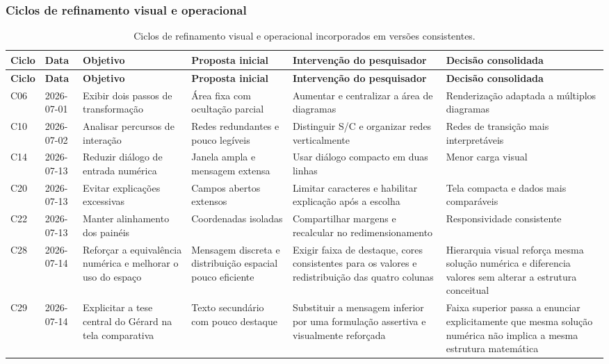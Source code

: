 \subsubsection{Ciclos de refinamento visual e operacional}
\begin{landscape}
\begingroup
\setlength{\tabcolsep}{3pt}
\small
\begin{longtable}{p{1.0cm}p{1.9cm}p{4.0cm}p{5.0cm}p{6.2cm}p{5.7cm}}
\caption{Ciclos de refinamento visual e operacional incorporados em versões consistentes.}\\
\toprule
\textbf{Ciclo} & \textbf{Data} & \textbf{Objetivo} & \textbf{Proposta inicial} & \textbf{Intervenção do pesquisador} & \textbf{Decisão consolidada} \\
\midrule
\endfirsthead
\toprule
\textbf{Ciclo} & \textbf{Data} & \textbf{Objetivo} & \textbf{Proposta inicial} & \textbf{Intervenção do pesquisador} & \textbf{Decisão consolidada} \\
\midrule
\endhead
C06 & 2026-07-01 & Exibir dois passos de transformação & Área fixa com ocultação parcial & Aumentar e centralizar a área de diagramas & Renderização adaptada a múltiplos diagramas \\
\addlinespace[2pt]
C10 & 2026-07-02 & Analisar percursos de interação & Redes redundantes e pouco legíveis & Distinguir S/C e organizar redes verticalmente & Redes de transição mais interpretáveis \\
\addlinespace[2pt]
C14 & 2026-07-13 & Reduzir diálogo de entrada numérica & Janela ampla e mensagem extensa & Usar diálogo compacto em duas linhas & Menor carga visual \\
\addlinespace[2pt]
C20 & 2026-07-13 & Evitar explicações excessivas & Campos abertos extensos & Limitar caracteres e habilitar explicação após a escolha & Tela compacta e dados mais comparáveis \\
\addlinespace[2pt]
C22 & 2026-07-13 & Manter alinhamento dos painéis & Coordenadas isoladas & Compartilhar margens e recalcular no redimensionamento & Responsividade consistente \\
\addlinespace[2pt]
C28 & 2026-07-14 & Reforçar a equivalência numérica e melhorar o uso do espaço & Mensagem discreta e distribuição espacial pouco eficiente & Exigir faixa de destaque, cores consistentes para os valores e redistribuição das quatro colunas & Hierarquia visual reforça mesma solução numérica e diferencia valores sem alterar a estrutura conceitual \\
\addlinespace[2pt]
C29 & 2026-07-14 & Explicitar a tese central do Gérard na tela comparativa & Texto secundário com pouco destaque & Substituir a mensagem inferior por uma formulação assertiva e visualmente reforçada & Faixa superior passa a enunciar explicitamente que mesma solução numérica não implica a mesma estrutura matemática \\

\end{longtable}
\end{landscape}
